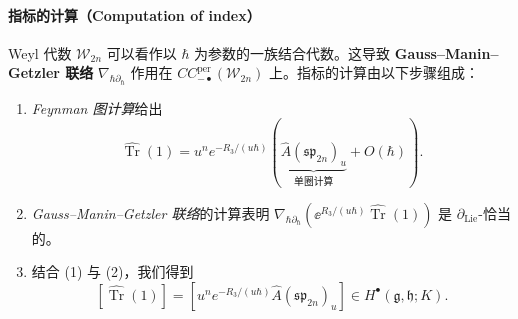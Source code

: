 
\paragraph*{指标的计算（Computation of index）}

Weyl 代数 $\mathcal{W}_{2n}$ 可以看作以 $\hbar$ 为参数的一族结合代数。这导致
\textbf{Gauss--Manin--Getzler 联络} $\nabla_{\hbar\partial_\hbar}$ 作用在
$CC^{\mathrm{per}}_{-\bullet}(\mathcal{W}_{2n})$ 上。指标的计算由以下步骤组成：
\begin{enumerate}[label=(\arabic*),leftmargin=1.8em,itemsep=0.3em]
  \item \emph{Feynman 图计算}给出
    \[
      \widehat{\operatorname{Tr}}(1)=u^ne^{-R_3/(u\hbar)}
      \left(\underbrace{\widehat{A}(\mathfrak{sp}_{2n})_u}_{\text{单圈计算}}
      +O(\hbar)\right).
    \]
  \item \emph{Gauss--Manin--Getzler 联络}的计算表明
    $\nabla_{\hbar\partial_\hbar}\left(\ee^{R_3/(u\hbar)}
    \widehat{\operatorname{Tr}}(1)\right)$ 是 $\partial_{\mathrm{Lie}}$-恰当的。
  \item 结合 (1) 与 (2)，我们得到
    \[
      \left[\widehat{\operatorname{Tr}}(1)\right]
      =\left[u^ne^{-R_3/(u\hbar)}\widehat{A}(\mathfrak{sp}_{2n})_u\right]
      \in H^\bullet(\mathfrak{g},\mathfrak{h};K).
    \]
\end{enumerate}

